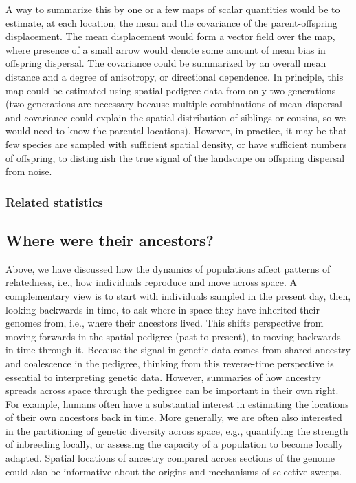 \documentclass{ar-1col}
\newcommand{\plr}[1]{{\color{green}{#1}}}
\newcommand{\todo}[1]{{\textbf{\color{red}{#1}}}}
\begin{document}
A way to summarize this by one or a few maps of scalar quantities would be to estimate, 
at each location, the mean and the covariance of the parent-offspring displacement.
The mean displacement would form a vector field over the map,
where presence of a small arrow would denote some amount of mean bias in offspring dispersal.
The covariance could be summarized by an overall mean distance and a degree of anisotropy, 
or directional dependence.
In principle, this map could be estimated using 
spatial pedigree data from only two generations 
(two generations are necessary because 
multiple combinations of mean dispersal and covariance 
could explain the spatial distribution of siblings or cousins, 
so we would need to know the parental locations).
However, in practice, it may be that 
few species are sampled with sufficient spatial density, 
or have sufficient numbers of offspring, 
to distinguish the true signal of the landscape on offspring dispersal from noise.


\subsubsection{Related statistics}

\todo{$m$ between "discrete pops", resistance distance.
methods: scat, ringbauer2018, ralphcoop, cayuela refs, cockerhaweir1993, eems, newEems, bedassle}

\subsection{Where were their ancestors?}

Above, we have discussed how the dynamics of populations affect
patterns of relatedness,
i.e., how individuals reproduce and move across space.
A complementary view is to
start with individuals sampled in the present day,
then, looking backwards in time,
to ask where in space they have inherited their genomes from, 
i.e., where their ancestors lived.
This shifts perspective from moving forwards in the spatial pedigree
(past to present),
to moving backwards in time through it.
Because the signal in genetic data comes from 
shared ancestry and coalescence in the pedigree,
thinking from this reverse-time perspective 
is essential to interpreting genetic data.
However, summaries of how ancestry spreads across space 
through the pedigree can be important in their own right.
For example, humans often have a substantial interest 
in estimating the locations of their own ancestors back in time.
More generally,
we are often also interested in the partitioning of genetic diversity across space,
e.g.,
quantifying the strength of inbreeding locally,
or assessing the capacity of a population to become locally adapted.
Spatial locations of ancestry compared across sections of the genome
could also be informative about the origins and mechanisms of selective sweeps.
\end{document}
